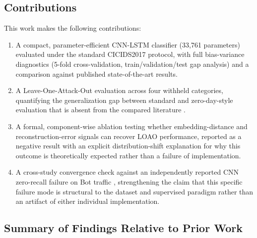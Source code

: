 \documentclass[11pt]{article}
\begin{document}
\subsection{Contributions}

This work makes the following contributions:

\begin{enumerate}
\item A compact, parameter-efficient CNN-LSTM classifier (33{,}761 parameters) evaluated under the
standard CICIDS2017 protocol, with full bias-variance diagnostics (5-fold cross-validation,
train/validation/test gap analysis) and a comparison against published state-of-the-art results.
\item A Leave-One-Attack-Out evaluation across four withheld categories, quantifying the
generalization gap between standard and zero-day-style evaluation that is absent from the compared
literature \cite{afraji2025,kumar2023}.
\item A formal, component-wise ablation testing whether embedding-distance and reconstruction-error
signals can recover LOAO performance, reported as a negative result with an explicit
distribution-shift explanation for why this outcome is theoretically expected rather than a failure
of implementation.
\item A cross-study convergence check against an independently reported CNN zero-recall failure on
Bot traffic \cite{xu2025}, strengthening the claim that this specific failure mode is structural to
the dataset and supervised paradigm rather than an artifact of either individual implementation.
\end{enumerate}

\subsection{Summary of Findings Relative to Prior Work}
\end{document}
